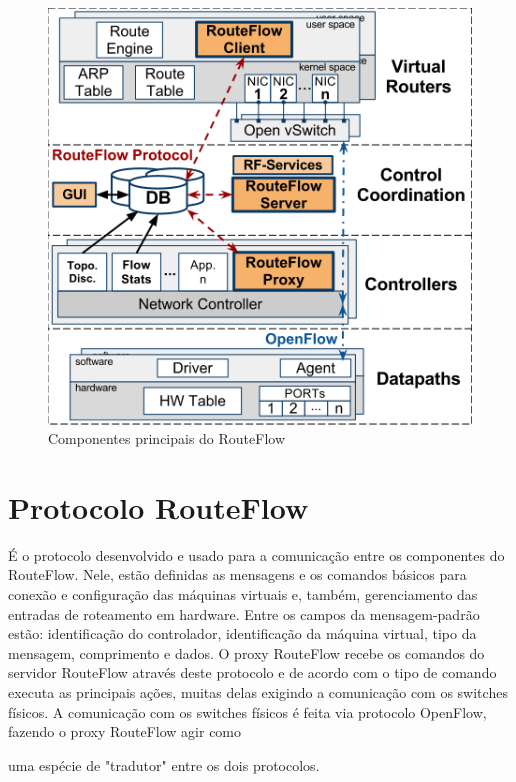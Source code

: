 \begin{figure}[hb]
\centering
\includegraphics[width=125mm]{componentesRouteFlow.png}
\caption{Componentes principais do 
RouteFlow}
\label{fig:componentesRouteFlow}
\end{figure}

\section{Protocolo RouteFlow}

É o protocolo desenvolvido e usado para a 
comunicação entre os componentes do 
RouteFlow. 
Nele, estão 
definidas as mensagens e os comandos básicos 
para conexão e
configuração das máquinas virtuais e, também, 
gerenciamento das entradas de roteamento em 
hardware. 
Entre os campos da mensagem-padrão estão: 
identificação do controlador,
identificação da máquina virtual, tipo da 
mensagem, comprimento e dados. O proxy 
RouteFlow recebe os  
comandos do servidor RouteFlow através deste 
protocolo e de acordo com o tipo de comando 
executa as 
principais ações, muitas delas exigindo a 
comunicação com os switches físicos. A 
comunicação com os 
switches físicos é feita via protocolo 
OpenFlow, fazendo o proxy RouteFlow agir como 

uma espécie de 
"tradutor" entre os dois protocolos.